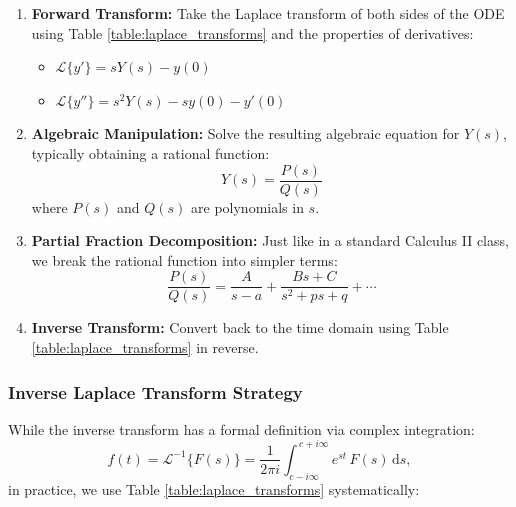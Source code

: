 \begin{enumerate}
\item \textbf{Forward Transform:} Take the Laplace transform of both sides of the ODE using Table \ref{table:laplace_transforms} and the properties of derivatives:
  \begin{itemize}
  \item \(\mathcal{L}\{y'\} = sY(s) - y(0)\)
  \item \(\mathcal{L}\{y''\} = s^2Y(s) - sy(0) - y'(0)\)
  \end{itemize}

\item \textbf{Algebraic Manipulation:} Solve the resulting algebraic equation for \(Y(s)\), typically obtaining a rational function:
  \[Y(s) = \frac{P(s)}{Q(s)}\]
  where \(P(s)\) and \(Q(s)\) are polynomials in \(s\).

\item \textbf{Partial Fraction Decomposition:} Just like in a standard Calculus II class, we break the rational function into simpler terms:
  \[\frac{P(s)}{Q(s)} = \frac{A}{s-a} + \frac{Bs + C}{s^2 + ps + q} + \cdots\]

\item \textbf{Inverse Transform:} Convert back to the time domain using Table \ref{table:laplace_transforms} in reverse.
\end{enumerate}

\subsubsection*{Inverse Laplace Transform Strategy}

While the inverse transform has a formal definition via complex integration:
\[
f(t) = \mathcal{L}^{-1}\{F(s)\} = \frac{1}{2\pi i} \int_{c - i \infty}^{\,c + i \infty} e^{s t}\,F(s)\,\mathrm{d}s,
\]
in practice, we use Table \ref{table:laplace_transforms} systematically:

